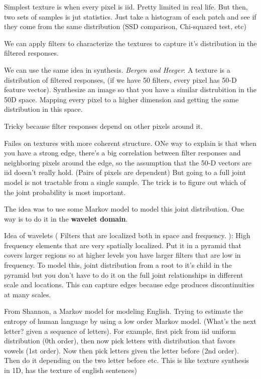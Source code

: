 Simplest texture is when every pixel is iid. Pretty limited in real
life. But then, two sets of samples is jut statistics. Just take a
histogram of each patch and see if they come from the same
distribution (SSD comparison, Chi-squared test, etc)

We can apply filters to characterize the textures to capture it's
distribution in the filtered responses. 

We can use the same idea in synthesis. \emph{Bergen and Heeger}: A texture is a distribution of
filtered responses, (if we have 50 filters, every pixel has 50-D
feature vector). Synthesize an image so that you have a similar
distrubition in the 50D space. Mapping every pixel to a higher
dimension and getting the same distribution in this space. 

Tricky because filter responses depend on other pixels around
it. 

Failes on textures with more coherent structure. ONe way to explain is
that when you have a strong edge, there's a big correlation between
filter responses and neighboring pixels around the edge, so the
assumption that the 50-D vectors are iid doesn't really hold. (Pairs
of pixels are dependent) But going to a full joint model is not
tractable from a single sample. The trick is to figure out which of
the joint probability is most important.

The idea was to use some Markov model to model this joint
distribution. One way is to do it in the \textbf{wavelet domain}. 


Idea of wavelets ( Filters that are localized both in space and frequency.
): High frequency elements that are very spatially
localized. Put it in a pyramid that covers larger regions so at higher
levels you have larger filters that are low in frequency. To model
this, joint distribution from a root to it's child in the pyramid but
you don't have to do it on the full joint relationships in different
scale and locations. 
This can capture edges because edge produces discontinuities at many
scales.

From Shannon, a Markov model for modeling English. Trying to estimate
the entropy of human language by using a low order Markov
model. (What's the next letter? given a sequence of letters). For
example, first
pick from iid uniform distribution (0th order), then now pick letters with
distribution that favors vowels (1st order). Now then pick letters
given the letter before (2nd order). Then do it depending on the two
letter before etc. This is like texture synthesis in 1D, has the
texture of english sentences)

